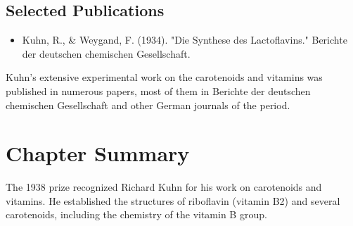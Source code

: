 \subsection*{Selected Publications}

\begin{itemize}

\item Kuhn, R., \& Weygand, F. (1934). "Die Synthese des Lactoflavins." Berichte der deutschen chemischen Gesellschaft.

\end{itemize}

Kuhn's extensive experimental work on the carotenoids and vitamins was published in numerous papers, most of them in Berichte der deutschen chemischen Gesellschaft and other German journals of the period.

\clearpage

\section*{Chapter Summary}

The 1938 prize recognized Richard Kuhn for his work on carotenoids and vitamins. He established the structures of riboflavin (vitamin B2) and several carotenoids, including the chemistry of the vitamin B group.
